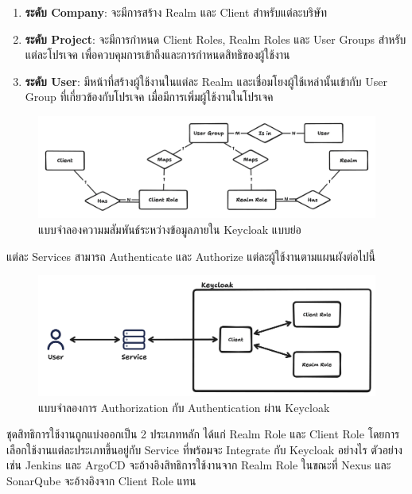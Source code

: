 \begin{enumerate}
    \item \textbf{ระดับ Company}: จะมีการสร้าง Realm และ Client สำหรับแต่ละบริษัท 
    \item \textbf{ระดับ Project}: จะมีการกำหนด Client Roles, Realm Roles และ User Groups สำหรับแต่ละโปรเจค เพื่อควบคุมการเข้าถึงและการกำหนดสิทธิของผู้ใช้งาน
    \item \textbf{ระดับ User}: มีหน้าที่สร้างผู้ใช้งานในแต่ละ Realm และเชื่อมโยงผู้ใช้เหล่านั้นเข้ากับ User Group ที่เกี่ยวข้องกับโปรเจค เมื่อมีการเพิ่มผู้ใช้งานในโปรเจค
\end{enumerate}
\begin{figure}[H]
    \begin{center}
        \includegraphics[scale=0.29]{resources/keycloak-er.png}
    \end{center}
    \caption[แบบจำลองความมสัมพันธ์ระหว่างข้อมูลภายใน Keycloak แบบย่อ]{แบบจำลองความมสัมพันธ์ระหว่างข้อมูลภายใน Keycloak แบบย่อ}
    \label{fig:keycloak-er}
\end{figure}
แต่ละ Services สามารถ Authenticate และ Authorize แต่ละผู้ใช้งานตามแผนผังต่อไปนี้
\begin{figure}[H]
    \begin{center}
        \includegraphics[scale=0.19]{resources/authorization-diagram.png}
    \end{center}
    \caption[แบบจำลองการ Authorization กับ Authentication ผ่าน Keycloak]{แบบจำลองการ Authorization กับ Authentication ผ่าน Keycloak}
    \label{fig:authorization-diagram}
\end{figure}
ชุดสิทธิการใช้งานถูกแบ่งออกเป็น 2 ประเภทหลัก ได้แก่ Realm Role และ Client Role โดยการเลือกใช้งานแต่ละประเภทขึ้นอยู่กับ Service ที่พร้อมจะ Integrate กับ Keycloak อย่างไร ตัวอย่างเช่น Jenkins และ ArgoCD จะอ้างอิงสิทธิการใช้งานจาก Realm Role ในขณะที่ Nexus และ SonarQube จะอ้างอิงจาก Client Role แทน


